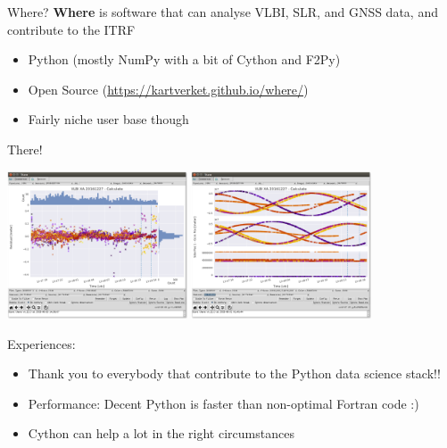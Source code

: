 \documentclass[12pt,table,t]{beamer}
\begin{document}
\begin{frame}[c]{Where?}
  \textbf{Where} is software that can analyse VLBI, SLR, and GNSS data, and contribute to the ITRF

  \begin{itemize}
  \item<2-> Python (mostly NumPy with a bit of Cython and F2Py)
  \item<3-> Open Source (\url{https://kartverket.github.io/where/})
  \item<4-> Fairly niche user base though
  \end{itemize}
\end{frame}


\begin{frame}[c]{There!}
  \begin{center}
    \includegraphics[width=0.4\textwidth]{figure/there_01} \hfil
    \includegraphics[width=0.4\textwidth]{figure/there_02}
  \end{center}

  Experiences:
  \begin{itemize}
  \item<2-> Thank you to everybody that contribute to the Python data science stack!!
  \item<3-> Performance: Decent Python is faster than non-optimal Fortran code :)
  \item<4-> Cython can help a lot in the right circumstances
  \end{itemize}
\end{frame}
\end{document}
